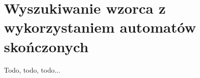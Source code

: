 \section{Wyszukiwanie wzorca z wykorzystaniem automatów skończonych}

\label{sec:wzorzecautomat}

Todo, todo, todo...